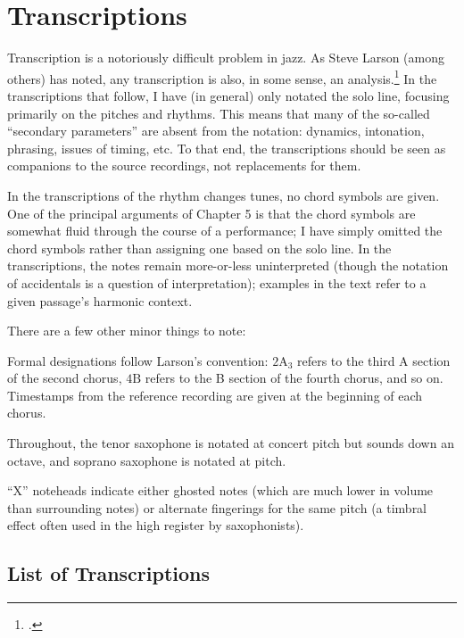\doublespacing
\chapter{Transcriptions}
\addtocspace
\singlespacing

Transcription is a notoriously difficult problem in jazz. As Steve Larson
(among others) has noted, any transcription is also, in some sense, an
analysis.\footcite[2]{larson:2009} In the transcriptions that follow, I have
(in general) only notated the solo line, focusing primarily on the pitches and
rhythms. This means that many of the so-called ``secondary parameters'' are
absent from the notation: dynamics, intonation, phrasing, issues of timing,
etc. To that end, the transcriptions should be seen as companions to the
source recordings, not replacements for them.

In the transcriptions of the rhythm changes tunes, no chord symbols are given.
One of the principal arguments of Chapter 5 is that the chord symbols are
somewhat fluid through the course of a performance; I have simply omitted the
chord symbols rather than assigning one based on the solo line. In the
transcriptions, the notes remain more-or-less uninterpreted (though the
notation of accidentals is a question of interpretation); examples in the text
refer to a given passage's harmonic context.

\vspace{\baselineskip}
\noindent There are a few other minor things to note:
\begin{compactitem}
  \item Formal designations follow Larson's convention: $2\mathrm{A}_3$ refers
    to the third A section of the second chorus, $4\mathrm{B}$ refers to the B
    section of the fourth chorus, and so on. Timestamps from the reference
    recording are given at the beginning of each chorus.
  \item Throughout, the tenor saxophone is notated at concert pitch but sounds
    down an octave, and soprano saxophone is notated at pitch.
  \item ``X'' noteheads indicate either ghosted notes (which are much lower in
    volume than surrounding notes) or alternate fingerings for the same pitch
    (a timbral effect often used in the high register by saxophonists).
\end{compactitem}

\section*{List of Transcriptions}

